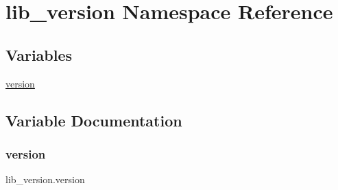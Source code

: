 \hypertarget{namespacelib__version}{}\section{lib\+\_\+version Namespace Reference}
\label{namespacelib__version}
\subsection*{Variables}
\begin{DoxyCompactItemize}
\item 
\hyperlink{namespacelib__version_a04092b9517954158b264d8f5f567ecc0}{version}
\end{DoxyCompactItemize}


\subsection{Variable Documentation}
\mbox{\label{namespacelib__version_a04092b9517954158b264d8f5f567ecc0}} 
\subsubsection{\texorpdfstring{version}{version}}
{\footnotesize\ttfamily lib\+\_\+version.\+version}

